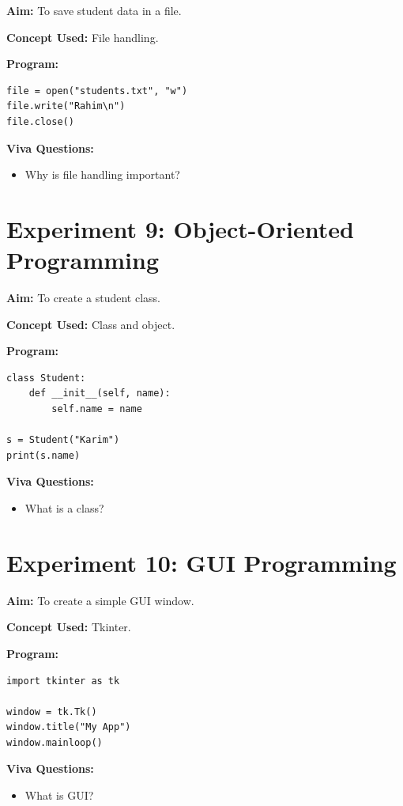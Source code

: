 \textbf{Aim:}  
To save student data in a file.

\textbf{Concept Used:}  
File handling.

\textbf{Program:}
\begin{verbatim}
file = open("students.txt", "w")
file.write("Rahim\n")
file.close()
\end{verbatim}

\textbf{Viva Questions:}
\begin{itemize}
    \item Why is file handling important?
\end{itemize}

\newpage
\section*{Experiment 9: Object-Oriented Programming}

\textbf{Aim:}  
To create a student class.

\textbf{Concept Used:}  
Class and object.

\textbf{Program:}
\begin{verbatim}
class Student:
    def __init__(self, name):
        self.name = name

s = Student("Karim")
print(s.name)
\end{verbatim}

\textbf{Viva Questions:}
\begin{itemize}
    \item What is a class?
\end{itemize}

\newpage
\section*{Experiment 10: GUI Programming}

\textbf{Aim:}  
To create a simple GUI window.

\textbf{Concept Used:}  
Tkinter.

\textbf{Program:}
\begin{verbatim}
import tkinter as tk

window = tk.Tk()
window.title("My App")
window.mainloop()
\end{verbatim}

\textbf{Viva Questions:}
\begin{itemize}
    \item What is GUI?
\end{itemize}

